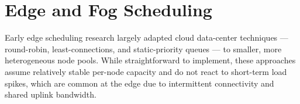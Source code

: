 \section{Edge and Fog Scheduling}

Early edge scheduling research largely adapted cloud data-center techniques ---
round-robin, least-connections, and static-priority queues --- to smaller,
more heterogeneous node pools. While straightforward to implement, these
approaches assume relatively stable per-node capacity and do not react to
short-term load spikes, which are common at the edge due to intermittent
connectivity and shared uplink bandwidth.
